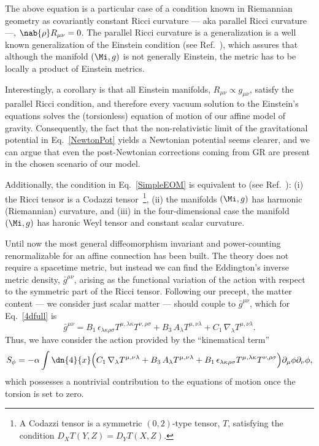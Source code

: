 \documentclass[aps,prl,twocolumn,superscriptaddress,showpacs,showkeys]{revtex4-1}
\begin{document}
The above equation is a particular case of a condition known in Riemannian geometry as covariantly constant Ricci curvature --- aka parallel Ricci curvature ---, \mbox{$\nab{\rho} R_{\mu\nu} = 0$.} The parallel Ricci curvature is a generalization is a well known generalization of the Einstein condition (see Ref.~\cite{Besse,MO-Bryant}), which assures that although the manifold $(\Mi,g)$ is not generally Einstein, the metric has to be locally a product of Einstein metrics.

Interestingly, a corollary is that all Einstein manifolds, \mbox{$R_{\mu\nu} \propto g_{\mu\nu}$,} satisfy the parallel Ricci condition, and therefore every vacuum solution to the Einstein's equations solves the (torsionless) equation of motion of our affine model of gravity. Consequently, the fact that the non-relativistic limit of the gravitational potential in Eq.~\eqref{NewtonPot} yields a Newtonian potential seems clearer, and we can argue that even the post-Newtonian corrections coming from GR are present in the chosen scenario of our model.

Additionally, the condition in Eq.~\eqref{SimpleEOM} is equivalent to (see Ref.~\cite{Besse}): (i) the Ricci tensor is a Codazzi tensor~\footnote{A Codazzi tensor is a symmetric $(0,2)$-type tensor, $T$, satisfying the condition \mbox{$D_X T(Y,Z) = D_Y T(X,Z)$.}}, (ii) the manifolds $(\Mi,g)$ has harmonic (Riemannian) curvature, and (iii) in the four-dimensional case the manifold $(\Mi,g)$ has haronic Weyl tensor and constant scalar curvature.

Until now the most general diffeomorphism invariant and power-counting renormalizable for an affine connection has been built. The theory does not require a spacetime metric, but instead we can find the Eddington's inverse metric density, $\bar{g}^{\mu\nu}$, arising as the functional variation of the action with respect to the symmetric part of the Ricci tensor. Following our precept, the matter content --- we consider just scalar matter --- should couple to $\bar{g}^{\mu\nu}$, which for Eq.~\eqref{4dfull} is
\begin{dmath}
  \bar{g}^{\mu\nu} = B_1\, \epsilon_{\lambda\kappa\rho\sigma} T^{\mu, \lambda\kappa} T^{\nu, \rho\sigma} + B_3\, A_\lambda T^{\mu,\nu\lambda} + C_1\, \nabla_\lambda T^{\mu,\nu\lambda}.
\end{dmath}
Thus, we have consider the action provided by the ``kinematical term''
\begin{dmath}
  \label{ScalarAction}
  S_\phi = - \alpha \int \dn{4}{x} \Big( C_1\, \nabla_\lambda T^{\mu,\nu\lambda}  + B_3\, A_\lambda T^{\mu,\nu\lambda} + B_1\, \epsilon_{\lambda\kappa\rho\sigma} T^{\mu, \lambda\kappa} T^{\nu, \rho\sigma} \Big) \partial_\mu\phi\partial_\nu\phi,
\end{dmath}
which possesses a nontrivial contribution to the equations of motion once the torsion is set to zero.
\end{document}
